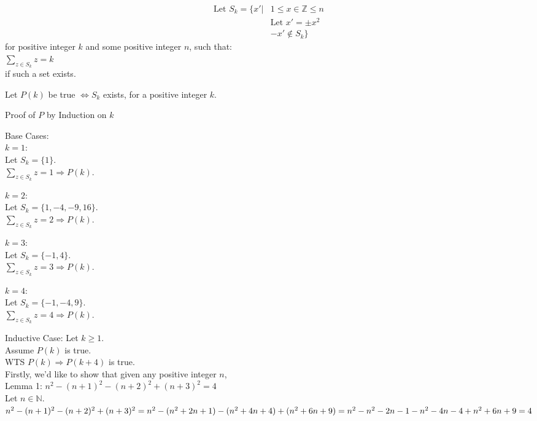 \documentclass[fleqn]{article}
\begin{document}
\begin{align*}
  \text{Let } S_{k} = \lbrace x' | & 1 \leq x \in \mathbb{Z} \leq n \\
	                          & \text{Let } x' = \pm x^2 \\
		                  & -x' \not\in S_{k}
             \rbrace
             \end{align*}
for positive integer $k$ and some positive integer $n$, such that:\\
$\displaystyle\sum\limits_{z \in S_{k}} z = k$\\
if such a set exists.

Let $P(k)$ be true $\Leftrightarrow S_{k} $ exists, for a positive integer $k$.

Proof of $P$ by Induction on $k$

Base Cases:\\
$k = 1:$\\
Let $S_{k} = \lbrace 1 \rbrace$.\\
$\displaystyle\sum\limits_{z \in S_{k}} z = 1 \Rightarrow P(k)$.

$k = 2:$\\
Let $S_{k} = \lbrace 1,-4,-9,16 \rbrace$.\\
$\displaystyle\sum\limits_{z \in S_{k}} z = 2 \Rightarrow P(k)$.

$k = 3:$\\
Let $S_{k} = \lbrace-1,4\rbrace$.\\
$\displaystyle\sum\limits_{z \in S_{k}} z = 3 \Rightarrow P(k)$.

$k = 4:$\\
Let $S_{k} = \lbrace -1,-4,9 \rbrace$.\\
$\displaystyle\sum\limits_{z \in S_{k}} z = 4 \Rightarrow P(k)$.

Inductive Case: Let $k \geq 1$.\\
Assume $P(k)$ is true.\\
WTS $P(k) \Rightarrow P(k+4)$ is true.\\
Firstly, we'd like to show that given any positive integer $n$, \\
Lemma 1: $n^2 - (n+1)^2 - (n+2)^2 + (n+3)^2 = 4$\\
Let $n \in \mathbb{N}$.\\
$n^2 - (n+1) ^2 - (n+2)^2 + (n+3)^2 =\\
n^2 - (n^2 + 2n + 1) - (n^2 + 4n + 4) + (n^2 + 6n + 9) =\\
n^2 - n^2 - 2n - 1 - n^2 - 4n - 4 + n^2 + 6n + 9 = \\
4 $
\end{document}
